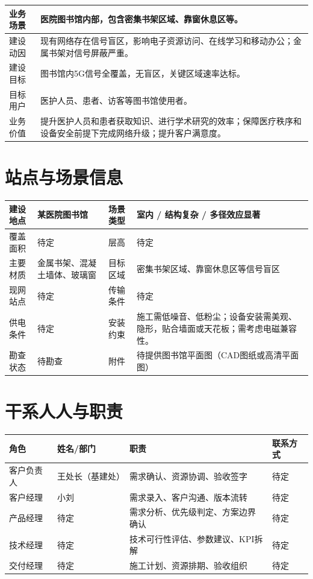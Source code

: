 \documentclass[12pt,a4paper]{ctexart}
\begin{document}
\begin{tabularx}{\textwidth}{|P{3.2cm}|Y|}
\hline
业务场景 & 医院图书馆内部，包含密集书架区域、靠窗休息区等。
 \\ \hline
建设动因 & 现有网络存在信号盲区，影响电子资源访问、在线学习和移动办公；金属书架对信号屏蔽严重。
 \\ \hline
建设目标 & 图书馆内5G信号全覆盖，无盲区，关键区域速率达标。
 \\ \hline
目标用户 & 医护人员、患者、访客等图书馆使用者。
 \\ \hline
业务价值 & 提升医护人员和患者获取知识、进行学术研究的效率；保障医疗秩序和设备安全前提下完成网络升级；提升客户满意度。
 \\ \hline
\end{tabularx}

\section{站点与场景信息}

\begin{tabularx}{\textwidth}{|P{3.2cm}|Y|P{3.2cm}|Y|}
\hline
建设地点 & 某医院图书馆
 & 场景类型 & 室内 / 结构复杂 / 多径效应显著
 \\ \hline
覆盖面积 & 待定
 & 层高 & 待定
 \\ \hline
主要材质 & 金属书架、混凝土墙体、玻璃窗
 & 目标区域 & 密集书架区域、靠窗休息区等信号盲区
 \\ \hline
现网站点 & 待定
 & 传输条件 & 待定
 \\ \hline
供电条件 & 待定
 & 安装约束 & 施工需低噪音、低粉尘；设备安装需美观、隐形，贴合墙面或天花板；需考虑电磁兼容性。
 \\ \hline
勘查状态 & 待勘查
 & 附件 & 待提供图书馆平面图（CAD图纸或高清平面图）
 \\ \hline
\end{tabularx}

\section{干系人人与职责}

\begin{tabularx}{\textwidth}{|P{3.2cm}|P{3.0cm}|Y|P{3.0cm}|}
\hline
角色 & 姓名/部门 & 职责 & 联系方式 \\
\hline
客户负责人 & 王处长（基建处）
 & 需求确认、资源协调、验收签字 & 待定
 \\ \hline
客户经理 & 小刘
 & 需求录入、客户沟通、版本流转 & 待定
 \\ \hline
产品经理 & 待定
 & 需求分析、优先级判定、方案边界确认 & 待定
 \\ \hline
技术经理 & 待定
 & 技术可行性评估、参数建议、KPI拆解 & 待定
 \\ \hline
交付经理 & 待定
 & 施工计划、资源排期、验收组织 & 待定
 \\ \hline
\end{tabularx}
\end{document}

